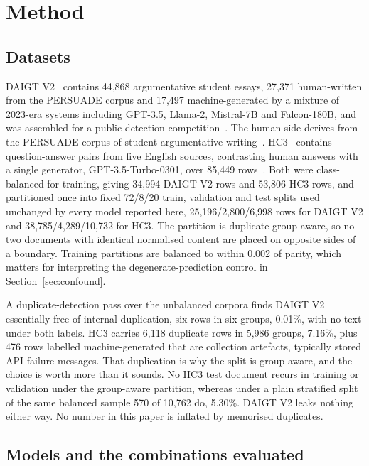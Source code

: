 \section{Method}

\subsection{Datasets}

DAIGT V2~\cite{Thedrcat2023daigtv2} contains 44,868 argumentative student essays, 27,371 human-written from the PERSUADE corpus and 17,497 machine-generated by a mixture of 2023-era systems including GPT-3.5, Llama-2, Mistral-7B and Falcon-180B, and was assembled for a public detection competition~\cite{Kaggle2023llmdetect}. The human side derives from the PERSUADE corpus of student argumentative writing~\cite{Crossley2023persuade}. HC3~\cite{Guo2023close} contains question-answer pairs from five English sources, contrasting human answers with a single generator, GPT-3.5-Turbo-0301, over 85,449 rows~\cite{HelloSimpleAI2023hc3}. Both were class-balanced for training, giving 34,994 DAIGT V2 rows and 53,806 HC3 rows, and partitioned once into fixed 72/8/20 train, validation and test splits used unchanged by every model reported here, 25,196/2,800/6,998 rows for DAIGT V2 and 38,785/4,289/10,732 for HC3. The partition is duplicate-group aware, so no two documents with identical normalised content are placed on opposite sides of a boundary. Training partitions are balanced to within 0.002 of parity, which matters for interpreting the degenerate-prediction control in Section~\ref{sec:confound}.

A duplicate-detection pass over the unbalanced corpora finds DAIGT V2 essentially free of internal duplication, six rows in six groups, 0.01\%, with no text under both labels. HC3 carries 6,118 duplicate rows in 5,986 groups, 7.16\%, plus 476 rows labelled machine-generated that are collection artefacts, typically stored API failure messages. That duplication is why the split is group-aware, and the choice is worth more than it sounds. No HC3 test document recurs in training or validation under the group-aware partition, whereas under a plain stratified split of the same balanced sample 570 of 10,762 do, 5.30\%. DAIGT V2 leaks nothing either way. No number in this paper is inflated by memorised duplicates.

\subsection{Models and the combinations evaluated}

